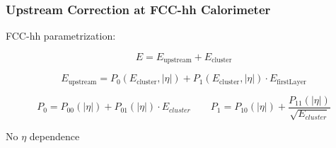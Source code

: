\documentclass{beamer}
\newcommand{\redtext}[1]{%
  \textcolor{myRed}{#1}
}
\begin{document}
\begin{frame}
  \frametitle{Upstream Correction at FCC-hh Calorimeter}

  \redtext{FCC-hh} parametrization:

  \begin{equation*}
    E = E_\text{upstream} + E_\text{cluster}
  \end{equation*}

  \begin{equation*}
  E_\text{upstream} = P_0(E_\text{cluster}, |\eta|) +
                      P_1(E_\text{cluster}, |\eta|) \cdot E_\text{firstLayer}
  \end{equation*}

  \begin{equation*}
    P_0 = P_{00}(|\eta|) + P_{01}(|\eta|) \cdot E_{cluster}  \qquad
    P_1 = P_{10}(|\eta|) + \frac{P_{11}(|\eta|)}{\sqrt{E_{cluster}}}
  \end{equation*}

  \begin{center}
    No $\eta$ dependence
  \end{center}
\end{frame}
\end{document}
